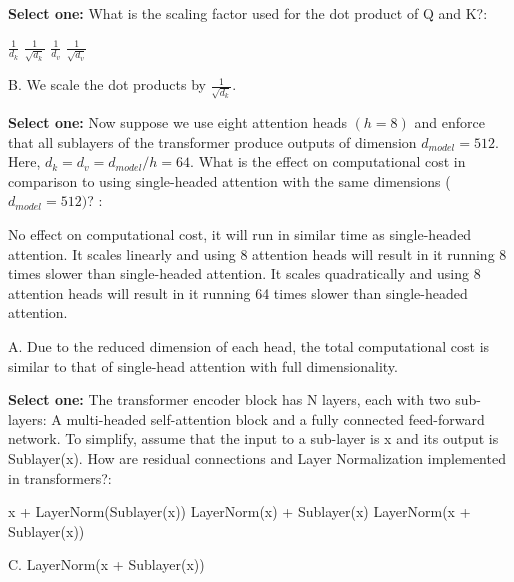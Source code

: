 \begin{parts}
\begin{subparts}
        \subpart[1]  \textbf{Select one:} What is the scaling factor used for the dot product of Q and K?:
    \begin{checkboxes}
        \choice $\frac{1}{d_k}$ 
        \choice $\frac{1}{\sqrt{d_k}}$ 
        \choice $\frac{1}{d_v}$ 
        \choice $\frac{1}{\sqrt{d_v}}$ 
    \end{checkboxes}
        \begin{soln} 
            B. We scale the dot products by $\frac{1}{\sqrt{d_k}}$.
        \end{soln}


        \subpart[2]  \textbf{Select one:} Now suppose we use eight attention heads $(h = 8)$ and enforce that all sublayers of the transformer produce outputs of dimension $d_{model} = 512$. Here, $d_k = d_v = d_{model} / h = 64$. What is the effect on computational cost in comparison to using single-headed attention with the same dimensions ($d_{model} = 512)$? :
    \begin{checkboxes}
        \choice No effect on computational cost, it will run in similar time as single-headed attention.
        \choice It scales linearly and using 8 attention heads will result in it running 8 times slower than single-headed attention.
        \choice It scales quadratically and using 8 attention heads will result in it running 64 times slower than single-headed attention.
    \end{checkboxes}
        \begin{soln} 
            A. Due to the reduced dimension of each head, the total computational cost
is similar to that of single-head attention with full dimensionality.
        \end{soln}

        \subpart[2]  \textbf{Select one:} The transformer encoder block has N layers, each with two sub-layers: A multi-headed self-attention block and a fully connected feed-forward network. To simplify, assume that the input to a sub-layer is x and its output is Sublayer(x). How are residual connections and Layer Normalization implemented in transformers?:
    \begin{checkboxes}
        \choice x + LayerNorm(Sublayer(x))
        \choice LayerNorm(x) + Sublayer(x)
        \choice LayerNorm(x + Sublayer(x)) 
    \end{checkboxes}
        \begin{soln} 
            C. LayerNorm(x + Sublayer(x))
        \end{soln}
        


\end{subparts}
\end{parts}
